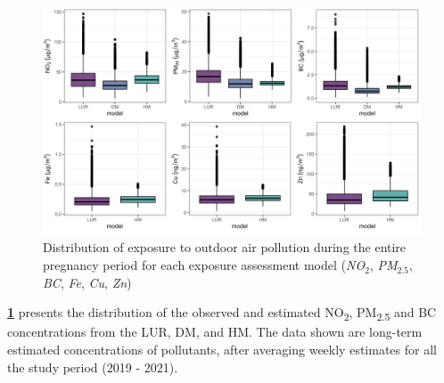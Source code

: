 \documentclass{article}
\begin{document}
\begin{figure}[!htb]
\includegraphics[width=1.0\textwidth]{figures/boxplot_all_models_estimates.png}
\caption{Distribution of exposure to outdoor air pollution during the entire pregnancy period for each exposure assessment model (\textit{NO$_2$}, \textit{PM$_{2.5}$}, \textit{BC}, \textit{Fe}, \textit{Cu}, \textit{Zn})}
\label{fig2}
\end{figure}


\textbf{\cref{fig2}} presents the distribution of the observed and estimated NO\textsubscript{2}, PM\textsubscript{2.5} and BC concentrations from the LUR, DM, and HM. The data shown are long-term estimated concentrations of pollutants, after averaging weekly estimates for all the study period (2019 - 2021).   


\newpage

\end{document}
